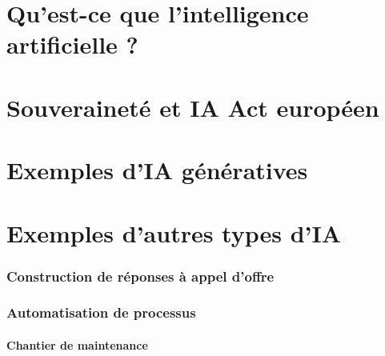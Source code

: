 \localized
\localized

\begin{bibliographysection}

\part[subtitle={Concepts et modèles dans les applications modernes}]{Qu'est-ce que l'intelligence artificielle ?}
\MinskyAItrue %
\OECDAIfalse %
\EUAIActtrue %
\localized
\localized
\localized
\localized
\localized
\localized
\localized

\part[subtitle={Le point de vue d'un technologue}]{Souveraineté et IA Act européen}
\localized

\part{Exemples d'IA génératives}
\localized
\localized
\localized
\localized
\localized

\part[subtitle={Principalement issus des travaux du laboratoire CIAD}]{Exemples d'autres types d'IA}
\section{Construction de réponses à appel d'offre}
\localized
\section{Automatisation de processus}
\subsection{Chantier de maintenance}
\localized

\end{bibliographysection}
